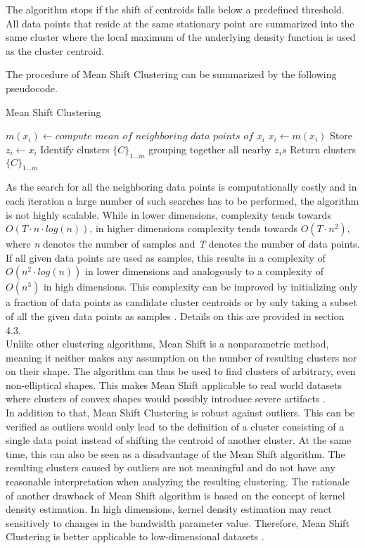 The algorithm stops if the shift of centroids falls below a predefined threshold. All data points that reside at the same stationary point are summarized into the same cluster where the local maximum of the underlying density function is used as the cluster centroid. 

The procedure of Mean Shift Clustering can be summarized by the following pseudocode.
\begin{algorithm}
	\caption{Mean Shift Clustering} 
	\begin{algorithmic}[1]
				\State $m(x_{i})\leftarrow compute$ $mean$ $of$ $neighboring$ $data$ $points$ $of$ $x_{i}$
				\State $x_{i}\leftarrow m(x_{i})$
			\EndWhile
			\State Store $z_{i}\leftarrow x_{i}$ 
		\EndFor
		\State Identify clusters $\{C\}_{1\ldots m}$ grouping together all nearby $z_{i}s$ 
		\State Return clusters $\{C\}_{1 \ldots m}$
	\end{algorithmic} 
\end{algorithm}

As the search for all the neighboring data points is computationally costly and in each iteration a large number of such searches has to be performed, the algorithm is not highly scalable. While in lower dimensions, complexity tends towards $O(T \cdot n \cdot log(n))$, in higher dimensions complexity tends towards $O(T \cdot n^{2})$, where \textit{n} denotes the number of samples and \textit{T} denotes the number of data points. If all given data points are used as samples, this results in a complexity of $O(n^{2} \cdot log(n))$ in lower dimensions and analogously to a complexity of $O(n^{3})$ in high dimensions. This complexity can be improved by initializing only a fraction of data points as candidate cluster centroids or by only taking a subset of all the given data points as samples \cite{sklearn_api}. Details on this are provided in section 4.3. \\
Unlike other clustering algorithms, Mean Shift is a nonparametric method, meaning it neither makes any assumption on the number of resulting clusters nor on their shape. The algorithm can thus be used to find clusters of arbitrary, even non-elliptical shapes. This makes Mean Shift applicable to real world datasets where clusters of convex shapes would possibly introduce severe artifacts \cite{comaniciu2002MeanShift}.\\
In addition to that, Mean Shift Clustering is robust against outliers. This can be verified as outliers would only lead to the definition of a cluster consisting of a single data point instead of shifting the centroid of another cluster. At the same time, this can also be seen as a disadvantage of the Mean Shift algorithm.
The resulting clusters caused by outliers are not meaningful and do not have any reasonable interpretation when analyzing the resulting clustering. 
The rationale of another drawback of Mean Shift algorithm is based on the concept of kernel density estimation. In high dimensions, kernel density estimation may react sensitively to changes in the bandwidth parameter value. Therefore, Mean Shift Clustering is better applicable to low-dimensional datasets \cite{CarreiraPerpin2015ARO}.